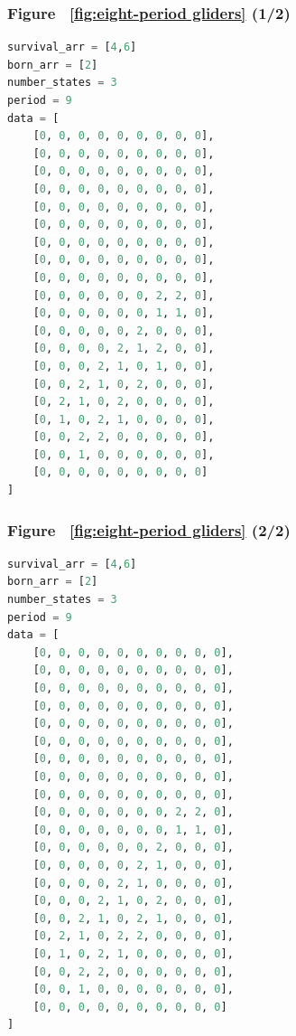 \documentclass[12pt]{article}
\numberwithin{figure}{section} %
\begin{document}
\subsubsection{Figure ~\ref{fig:eight-period gliders} (1/2)}
\label{subsubsection:eight-period gliders (1/2)}
\begin{lstlisting}[language = Python]
survival_arr = [4,6]
born_arr = [2]
number_states = 3
period = 9
data = [
    [0, 0, 0, 0, 0, 0, 0, 0, 0],
    [0, 0, 0, 0, 0, 0, 0, 0, 0],
    [0, 0, 0, 0, 0, 0, 0, 0, 0],
    [0, 0, 0, 0, 0, 0, 0, 0, 0],
    [0, 0, 0, 0, 0, 0, 0, 0, 0],
    [0, 0, 0, 0, 0, 0, 0, 0, 0],
    [0, 0, 0, 0, 0, 0, 0, 0, 0],
    [0, 0, 0, 0, 0, 0, 0, 0, 0],
    [0, 0, 0, 0, 0, 0, 0, 0, 0],
    [0, 0, 0, 0, 0, 0, 2, 2, 0],
    [0, 0, 0, 0, 0, 0, 1, 1, 0],
    [0, 0, 0, 0, 0, 2, 0, 0, 0],
    [0, 0, 0, 0, 2, 1, 2, 0, 0],
    [0, 0, 0, 2, 1, 0, 1, 0, 0],
    [0, 0, 2, 1, 0, 2, 0, 0, 0],
    [0, 2, 1, 0, 2, 0, 0, 0, 0],
    [0, 1, 0, 2, 1, 0, 0, 0, 0],
    [0, 0, 2, 2, 0, 0, 0, 0, 0],
    [0, 0, 1, 0, 0, 0, 0, 0, 0],
    [0, 0, 0, 0, 0, 0, 0, 0, 0]
]

\end{lstlisting}

\subsubsection{Figure ~\ref{fig:eight-period gliders} (2/2)}
\label{subsubsection:eight-period gliders (2/2)}
\begin{lstlisting}[language = Python]
survival_arr = [4,6]
born_arr = [2]
number_states = 3
period = 9
data = [
    [0, 0, 0, 0, 0, 0, 0, 0, 0, 0],
    [0, 0, 0, 0, 0, 0, 0, 0, 0, 0],
    [0, 0, 0, 0, 0, 0, 0, 0, 0, 0],
    [0, 0, 0, 0, 0, 0, 0, 0, 0, 0],
    [0, 0, 0, 0, 0, 0, 0, 0, 0, 0],
    [0, 0, 0, 0, 0, 0, 0, 0, 0, 0],
    [0, 0, 0, 0, 0, 0, 0, 0, 0, 0],
    [0, 0, 0, 0, 0, 0, 0, 0, 0, 0],
    [0, 0, 0, 0, 0, 0, 0, 0, 0, 0],
    [0, 0, 0, 0, 0, 0, 0, 2, 2, 0],
    [0, 0, 0, 0, 0, 0, 0, 1, 1, 0],
    [0, 0, 0, 0, 0, 0, 2, 0, 0, 0],
    [0, 0, 0, 0, 0, 2, 1, 0, 0, 0],
    [0, 0, 0, 0, 2, 1, 0, 0, 0, 0],
    [0, 0, 0, 2, 1, 0, 2, 0, 0, 0],
    [0, 0, 2, 1, 0, 2, 1, 0, 0, 0],
    [0, 2, 1, 0, 2, 2, 0, 0, 0, 0],
    [0, 1, 0, 2, 1, 0, 0, 0, 0, 0],
    [0, 0, 2, 2, 0, 0, 0, 0, 0, 0],
    [0, 0, 1, 0, 0, 0, 0, 0, 0, 0],
    [0, 0, 0, 0, 0, 0, 0, 0, 0, 0]
]
\end{lstlisting}
\end{document}
